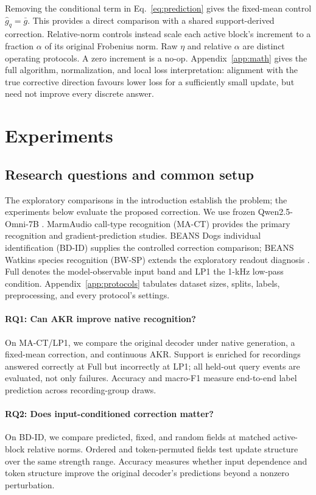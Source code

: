 \documentclass{article}
\newcommand{\method}{AKR}
\begin{document}
Removing the conditional term in Eq.~\ref{eq:prediction} gives the fixed-mean control $\widehat g_q=\bar g$. This provides a direct comparison with a shared support-derived correction. Relative-norm controls instead scale each active block's increment to a fraction $\alpha$ of its original Frobenius norm. Raw $\eta$ and relative $\alpha$ are distinct operating protocols. A zero increment is a no-op. Appendix~\ref{app:math} gives the full algorithm, normalization, and local loss interpretation: alignment with the true corrective direction favours lower loss for a sufficiently small update, but need not improve every discrete answer.

\section{Experiments}
\label{sec:experiments}
\subsection{Research questions and common setup}
\label{sec:setup}
The exploratory comparisons in the introduction establish the problem; the experiments below evaluate the proposed correction. We use frozen Qwen2.5-Omni-7B \citep{xu2025qwen}. MarmAudio call-type recognition (MA-CT) \citep{lamothe2025marmaudio} provides the primary recognition and gradient-prediction studies. BEANS Dogs individual identification (BD-ID) supplies the controlled correction comparison; BEANS Watkins species recognition (BW-SP) extends the exploratory readout diagnosis \citep{hagiwara2022beans}. Full denotes the model-observable input band and LP1 the 1-kHz low-pass condition. Appendix~\ref{app:protocols} tabulates dataset sizes, splits, labels, preprocessing, and every protocol's settings.

\paragraph{RQ1: Can AKR improve native recognition?}
On MA-CT/LP1, we compare the original decoder under native generation, a fixed-mean correction, and continuous \method. Support is enriched for recordings answered correctly at Full but incorrectly at LP1; all held-out query events are evaluated, not only failures. Accuracy and macro-F1 measure end-to-end label prediction across recording-group draws.

\paragraph{RQ2: Does input-conditioned correction matter?}
On BD-ID, we compare predicted, fixed, and random fields at matched active-block relative norms. Ordered and token-permuted fields test update structure over the same strength range. Accuracy measures whether input dependence and token structure improve the original decoder's predictions beyond a nonzero perturbation.
\end{document}
